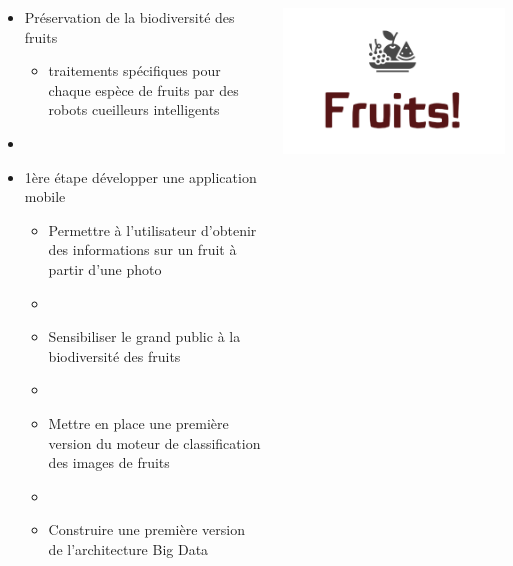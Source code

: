 \documentclass[8pt,aspectratio=169,hyperref={unicode=true}]{beamer}
\begin{document}
\begin{frame}{\insertsubsection}
  \begin{columns}
    \begin{column}{.6\textwidth}
      \begin{itemize}
        \item Préservation de la biodiversité des fruits
              \begin{itemize}
                \item traitements spécifiques pour chaque espèce de fruits par des robots cueilleurs intelligents
              \end{itemize}
        \item[]
        \item 1ère étape développer une application mobile
              \begin{itemize}
                \item Permettre à l'utilisateur d'obtenir des informations sur un fruit à partir d'une photo
                \item[]
                \item Sensibiliser le grand public à la biodiversité des fruits
                \item[]
                \item Mettre en place une première version du moteur de classification des images de fruits
                \item[]
                \item Construire une première version de l'architecture Big Data
              \end{itemize}
      \end{itemize}

    \end{column}
    \begin{column}{.4\textwidth}
      \center
      \includegraphics[width=\textwidth]{./Logo projet big data.png}
    \end{column}
  \end{columns}
\end{frame}
\end{document}

